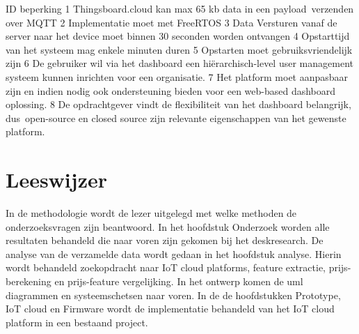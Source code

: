 ID 
beperking 
1 
Thingsboard.cloud kan max 65 kb data in een payload  verzenden over MQTT 
2 
Implementatie moet met FreeRTOS 
3 
Data Versturen vanaf de server naar het device moet binnen 30 seconden worden ontvangen 
4 
Opstarttijd van het systeem mag enkele minuten duren 
5 
Opstarten moet gebruiksvriendelijk zijn 
6 
De gebruiker wil via het dashboard een hiërarchisch-level user management systeem kunnen inrichten voor een organisatie. 
7 
Het platform moet aanpasbaar zijn en indien nodig ook ondersteuning bieden voor een web-based dashboard oplossing. 
8 
De opdrachtgever vindt de flexibiliteit van het dashboard belangrijk, dus  open-source en closed source zijn relevante eigenschappen van het gewenste platform. 



\section{Leeswijzer}
In  de methodologie wordt de lezer uitgelegd met welke methoden de onderzoeksvragen zijn beantwoord. In het hoofdstuk Onderzoek worden alle resultaten behandeld die naar voren zijn gekomen bij het deskresearch. De analyse van de verzamelde data wordt gedaan in het hoofdstuk analyse. Hierin wordt behandeld zoekopdracht naar IoT cloud platforms, feature extractie, prijs-berekening en prijs-feature vergelijking. In het ontwerp komen de uml diagrammen en systeemschetsen naar voren. In de  de hoofdstukken Prototype, IoT cloud en Firmware wordt de implementatie behandeld van het IoT cloud platform in een bestaand project.





